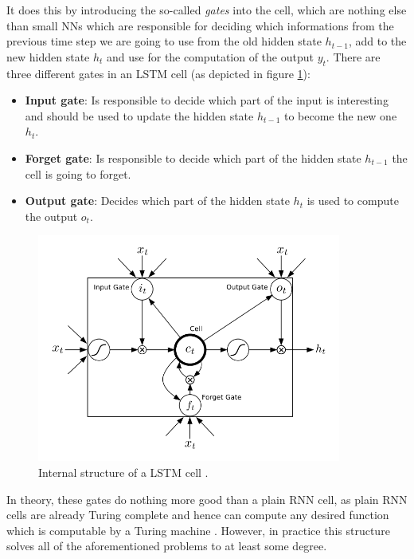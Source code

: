 It does this by introducing the so-called \emph{gates} into the cell, which are nothing else than small NNs which are responsible for deciding which informations from the previous time step we are going to use from the old hidden state $h_{t-1}$, add to the new hidden state $h_t$ and use for the computation of the output $y_t$. There are three different gates in an LSTM cell (as depicted in figure \ref{fundamentals:lstm:internal_structure}):

\begin{itemize}
	\item \textbf{Input gate}: Is responsible to decide which part of the input is interesting and should be used to update the hidden state $h_{t-1}$ to become the new one $h_t$.
	\item \textbf{Forget gate}: Is responsible to decide which part of the hidden state $h_{t-1}$ the cell is going to forget.
	\item \textbf{Output gate}: Decides which part of the hidden state $h_t$ is used to compute the output $o_t$.
\end{itemize}

\begin{figure}[h]
	\label{fundamentals:lstm:internal_structure}
	\centering
	\includegraphics[width=10cm]{img/lstm_internal}
	\caption{Internal structure of a LSTM cell \cite{Graves:2013}.}
\end{figure}

In theory, these gates do nothing more good than a plain RNN cell, as plain RNN cells are already Turing complete and hence can compute any desired function which is computable by a Turing machine \cite{Siegelmann:1995}. However, in practice this structure solves all of the aforementioned problems to at least some degree.

